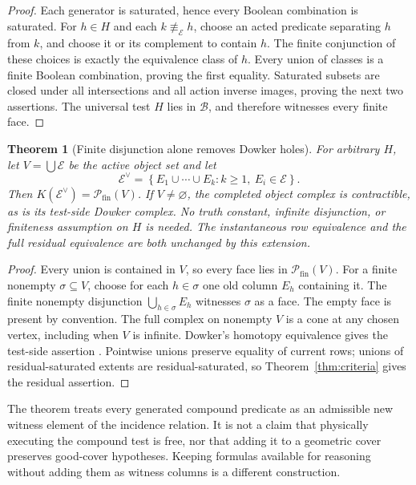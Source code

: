 \documentclass[11pt]{article}
\newtheorem{theorem}{Theorem}[section]
\theoremstyle{definition}
\newcommand{\Fin}{\mathcal P_{\mathrm{fin}}}
\begin{document}
\begin{proof}
Each generator is saturated, hence every Boolean combination is saturated.
For $h\in H$ and each $k\not\equiv_{\mathcal E}h$, choose an acted
predicate separating $h$ from $k$, and choose it or its complement to
contain $h$. The finite conjunction of these choices is exactly the
equivalence class of $h$. Every union of classes is a finite Boolean
combination, proving the first equality. Saturated subsets are closed
under all intersections and all action inverse images, proving the next
two assertions. The universal test $H$ lies in $\mathcal B$, and therefore
witnesses every finite face.
\end{proof}

\begin{theorem}[Finite disjunction alone removes Dowker holes]\label{thm:disjunction}
For arbitrary $H$, let $V=\bigcup\mathcal E$ be the active object set and
let
\[
 \mathcal E^\vee=
 \left\{E_1\cup\cdots\cup E_k:k\ge1,\ E_i\in\mathcal E\right\}.
\]
Then $K(\mathcal E^\vee)=\Fin(V)$. If $V\ne\varnothing$, the completed
object complex is contractible, as is its test-side Dowker complex.
No truth constant, infinite disjunction, or finiteness assumption on
$H$ is needed. The instantaneous row equivalence and the full residual
equivalence are both unchanged by this extension.
\end{theorem}

\begin{proof}
Every union is contained in $V$, so every face lies in $\Fin(V)$.
For a finite nonempty $\sigma\subseteq V$, choose for each
$h\in\sigma$ one old column $E_h$ containing it. The finite nonempty
disjunction $\bigcup_{h\in\sigma}E_h$ witnesses $\sigma$ as a face.
The empty face is present by convention. The full complex on nonempty
$V$ is a cone at any chosen vertex, including when $V$ is infinite.
Dowker's homotopy equivalence gives the test-side assertion
\cite{BrunSalbu}. Pointwise unions preserve equality of current rows;
unions of residual-saturated extents are residual-saturated, so
Theorem~\ref{thm:criteria} gives the residual assertion.
\end{proof}

The theorem treats every generated compound predicate as an admissible new
witness element of the incidence relation. It is not a claim that physically
executing the compound test is free, nor that adding it to a geometric cover
preserves good-cover hypotheses. Keeping formulas available for reasoning
without adding them as witness columns is a different construction.
\end{document}
